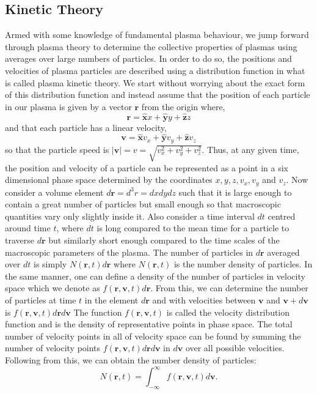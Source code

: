 \subsection{Kinetic Theory}
Armed with some knowledge of fundamental plasma behaviour, we jump forward through plasma theory to determine the collective properties of plasmas using averages over large numbers of particles. In order to do so, the positions and velocities of plasma particles are described using a distribution function in what is called plasma kinetic theory. We start without worrying about the exact form of this distribution function and instead assume that the position of each particle in our plasma is given by a vector $\mathbf{r}$ from the origin where,
\begin{equation}
\label{eq:KT_position}
\mathbf{r} = \mathbf{\hat{x}}x + \mathbf{\hat{y}}y + \mathbf{\hat{z}}z
\end{equation}
and that each particle has a linear velocity,
\begin{equation}
\label{eq:KT_velocity}
\mathbf{v} = \mathbf{\hat{x}}v_x + \mathbf{\hat{y}}v_y + \mathbf{\hat{z}}v_z
\end{equation}
so that the particle speed is $\vert \mathbf{v} \vert = v = \sqrt{v_x^2 + v_y^2 + v_z^2}$. Thus, at any given time, the position and velocity of a particle can be represented as a point in a six dimensional phase space determined by the coordinates $x, y, z, v_x, v_y$ and $v_z$. Now consider a volume element $d\mathbf{r} = d^3r = dxdydz$ such that it is large enough to contain a great number of particles but small enough so that macroscopic quantities vary only slightly inside it. Also consider a time interval $dt$ centred around time $t$, where $dt$ is long compared to the mean time for a particle to traverse $d\mathbf{r}$ but similarly short enough compared to the time scales of the macroscopic parameters of the plasma. The number of particles in $d\mathbf{r}$ averaged over $dt$ is simply $N(\mathbf{r},t)d\mathbf{r}$ where $N(\mathbf{r},t)$ is the number density of particles. In the same manner, one can define a density of the number of particles in velocity space which we denote as $f(\mathbf{r}, \mathbf{v}, t)d\mathbf{r}$. From this, we can determine the number of particles at time $t$ in the element $d\mathbf{r}$ and with velocities between $\mathbf{v}$ and $\mathbf{v} + d\mathbf{v}$ is $f(\mathbf{r}, \mathbf{v}, t)d\mathbf{r}d\mathbf{v}$ The function $f(\mathbf{r}, \mathbf{v}, t)$ is called the velocity distribution function and is the density of representative points in phase space. The total number of velocity points in all of velocity space can be found by summing the number of velocity points $f(\mathbf{r}, \mathbf{v}, t)d\mathbf{r}d\mathbf{v}$ in $d\mathbf{v}$ over all possible velocities. Following from this, we can obtain the number density of particles:
\begin{equation}
\label{eq:KT_number_density}
N(\mathbf{r},t) =\int^\infty_{-\infty}  f(\mathbf{r}, \mathbf{v}, t) d\mathbf{v}.
\end{equation}

